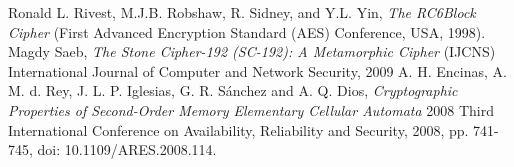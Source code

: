 \documentclass{article}
\begin{document}
\begin{thebibliography}{unsrt}
  Ronald L. Rivest, M.J.B. Robshaw, R. Sidney, and Y.L. Yin, \emph{The RC6\texttrademark Block Cipher} (First Advanced Encryption Standard (AES) Conference, USA, 1998).
  Magdy Saeb, \emph{The Stone Cipher-192 (SC-192): A Metamorphic Cipher} (IJCNS) International Journal of Computer and Network Security, 2009
  A. H. Encinas, A. M. d. Rey, J. L. P. Iglesias, G. R. Sánchez and A. Q. Dios, \emph{Cryptographic Properties of Second-Order Memory Elementary Cellular Automata} 2008 Third International Conference on Availability, Reliability and Security, 2008, pp. 741-745, doi: 10.1109/ARES.2008.114.
\end{thebibliography}
\end{document}
